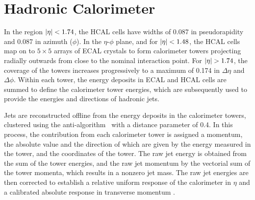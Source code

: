 
\section{Hadronic Calorimeter}

In the region $\lvert \eta \rvert < 1.74$, the HCAL cells have widths of 0.087 in pseudorapidity and 0.087 in azimuth ($\phi$). In the $\eta$-$\phi$ plane, and for $\lvert \eta \rvert < 1.48$, the HCAL cells map on to $5 \times 5$ arrays of ECAL crystals to form calorimeter towers projecting radially outwards from close to the nominal interaction point. For $\lvert \eta \rvert > 1.74$, the coverage of the towers increases progressively to a maximum of 0.174 in $\Delta \eta$ and $\Delta \phi$. Within each tower, the energy deposits in ECAL and HCAL cells are summed to define the calorimeter tower energies, which are subsequently used to provide the energies and directions of hadronic jets.

Jets are reconstructed offline from the energy deposits in the calorimeter towers, clustered using the anti-\kt algorithm~\cite{Cacciari:2008gp, Cacciari:2011ma} with a distance parameter of 0.4. In this process, the contribution from each calorimeter tower is assigned a momentum, the absolute value and the direction of which are given by the energy measured in the tower, and the coordinates of the tower. The raw jet energy is obtained from the sum of the tower energies, and the raw jet momentum by the vectorial sum of the tower momenta, which results in a nonzero jet mass. The raw jet energies are then corrected to establish a relative uniform response of the calorimeter in $\eta$ and a calibrated absolute response in transverse momentum \pt.

